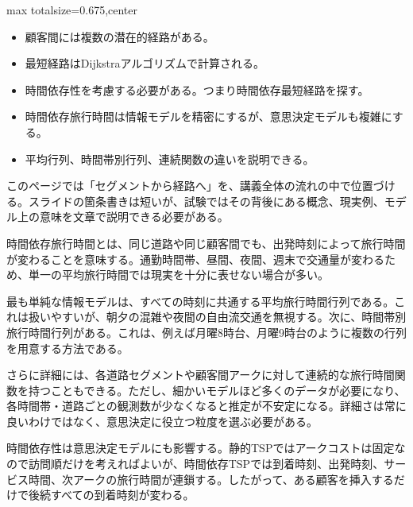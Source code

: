 \clearpage
{}
\begin{adjustbox}{max totalsize={\textwidth}{0.675\textheight},center}
\begin{minipage}{\textwidth}\scriptsize
\begin{minipage}[t]{0.485\textwidth}
\begin{itemize}
\item 顧客間には複数の潜在的経路がある。
\item 最短経路はDijkstraアルゴリズムで計算される。
\item 時間依存性を考慮する必要がある。つまり時間依存最短経路を探す。
\end{itemize}
\begin{itemize}
\item 時間依存旅行時間は情報モデルを精密にするが、意思決定モデルも複雑にする。
\item 平均行列、時間帯別行列、連続関数の違いを説明できる。
\end{itemize}
\end{minipage}\hfill
\begin{minipage}[t]{0.485\textwidth}
このページでは「セグメントから経路へ」を、講義全体の流れの中で位置づける。スライドの箇条書きは短いが、試験ではその背後にある概念、現実例、モデル上の意味を文章で説明できる必要がある。\par
時間依存旅行時間とは、同じ道路や同じ顧客間でも、出発時刻によって旅行時間が変わることを意味する。通勤時間帯、昼間、夜間、週末で交通量が変わるため、単一の平均旅行時間では現実を十分に表せない場合が多い。\par
最も単純な情報モデルは、すべての時刻に共通する平均旅行時間行列である。これは扱いやすいが、朝夕の混雑や夜間の自由流交通を無視する。次に、時間帯別旅行時間行列がある。これは、例えば月曜8時台、月曜9時台のように複数の行列を用意する方法である。\par
さらに詳細には、各道路セグメントや顧客間アークに対して連続的な旅行時間関数を持つこともできる。ただし、細かいモデルほど多くのデータが必要になり、各時間帯・道路ごとの観測数が少なくなると推定が不安定になる。詳細さは常に良いわけではなく、意思決定に役立つ粒度を選ぶ必要がある。\par
時間依存性は意思決定モデルにも影響する。静的TSPではアークコストは固定なので訪問順だけを考えればよいが、時間依存TSPでは到着時刻、出発時刻、サービス時間、次アークの旅行時間が連鎖する。したがって、ある顧客を挿入するだけで後続すべての到着時刻が変わる。\par

\end{minipage}
\end{minipage}
\end{adjustbox}

